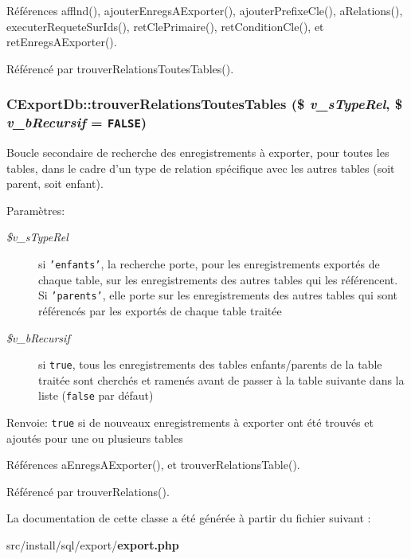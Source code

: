 Références afflnd(), ajouterEnregsAExporter(), ajouterPrefixeCle(), aRelations(), executerRequeteSurIds(), retClePrimaire(), retConditionCle(), et retEnregsAExporter().

Référencé par trouverRelationsToutesTables().
\subsubsection{\setlength{\rightskip}{0pt plus 5cm}CExportDb::trouverRelationsToutesTables (\$ {\em v\_\-sTypeRel}, \/  \$ {\em v\_\-bRecursif} = {\tt FALSE})}\label{class_c_export_db_f186efe6376b388828dc6600f9dc64d1}


Boucle secondaire de recherche des enregistrements à exporter, pour toutes les tables, dans le cadre d'un type de relation spécifique avec les autres tables (soit parent, soit enfant). 

\begin{Desc}
\item[Paramètres:]
\begin{description}
\item[{\em \$v\_\-sTypeRel}]si {\tt 'enfants'}, la recherche porte, pour les enregistrements exportés de chaque table, sur les enregistrements des autres tables qui les référencent. Si {\tt 'parents'}, elle porte sur les enregistrements des autres tables qui sont référencés par les exportés de chaque table traitée \item[{\em \$v\_\-bRecursif}]si {\tt true}, tous les enregistrements des tables enfants/parents de la table traitée sont cherchés et ramenés avant de passer à la table suivante dans la liste ({\tt false} par défaut)\end{description}
\end{Desc}
\begin{Desc}
\item[Renvoie:]{\tt true} si de nouveaux enregistrements à exporter ont été trouvés et ajoutés pour une ou plusieurs tables \end{Desc}


Références aEnregsAExporter(), et trouverRelationsTable().

Référencé par trouverRelations().

La documentation de cette classe a été générée à partir du fichier suivant :\begin{CompactItemize}
\item 
src/install/sql/export/{\bf export.php}\end{CompactItemize}

